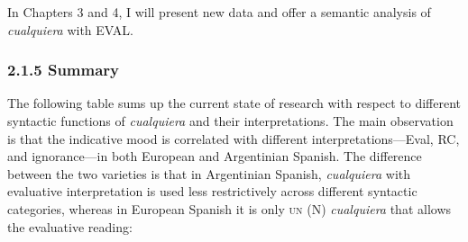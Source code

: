 \documentclass[output=paper]{langscibook}
\begin{document}
In Chapters 3 and 4, I will present new data and offer a semantic analysis of \textit{cualquiera} with EVAL.

\subsubsection{\textbf{2.1.5} \textbf{Summary} }

The following table sums up the current state of research with respect to different syntactic functions of \textit{cualquiera} and their interpretations. The main observation is that the indicative mood is correlated with different interpretations—Eval, RC, and ignorance—in both European and Argentinian Spanish. The difference between the two varieties is that in Argentinian Spanish, \textit{cualquiera} with evaluative interpretation is used less restrictively across different syntactic categories, whereas in European Spanish it is only \textsc{un} (N) \textit{cualquiera} that allows the evaluative reading:
\end{document}
